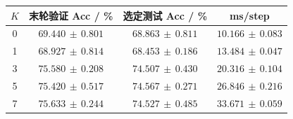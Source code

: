 \begin{tabular}{cccc}\toprule
$K$ & 末轮验证 Acc / \% & 选定测试 Acc / \% & ms/step \\ \midrule
0 & $69.440\,\pm\,0.801$ & $68.863\,\pm\,0.811$ & $10.166\,\pm\,0.083$ \\
1 & $68.927\,\pm\,0.814$ & $68.453\,\pm\,0.186$ & $13.484\,\pm\,0.047$ \\
3 & $75.580\,\pm\,0.208$ & $74.507\,\pm\,0.430$ & $20.316\,\pm\,0.104$ \\
5 & $75.420\,\pm\,0.517$ & $74.567\,\pm\,0.271$ & $26.846\,\pm\,0.216$ \\
7 & $75.633\,\pm\,0.244$ & $74.527\,\pm\,0.485$ & $33.671\,\pm\,0.059$ \\
\bottomrule\end{tabular}
